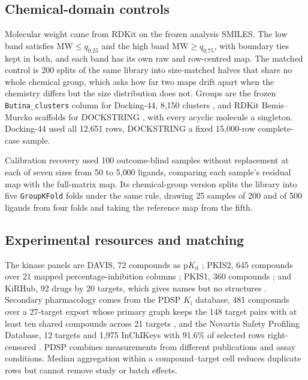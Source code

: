 \subsection{Chemical-domain controls}

Molecular weight came from RDKit on the frozen analysis SMILES. The low band satisfies
$\mathrm{MW}\le q_{0.25}$ and the high band $\mathrm{MW}\ge q_{0.75}$, with boundary ties kept in
both, and each band has its own raw and row-centred map. The matched control is 200 splits of
the same library into size-matched halves that share no whole chemical group, which asks how far
two maps drift apart when the chemistry differs but the size distribution does not. Groups are
the frozen \texttt{Butina\_clusters} column for Docking-44, 8{,}150 clusters \cite{butina1999},
and RDKit Bemis--Murcko scaffolds for DOCKSTRING \cite{murcko1996}, with every acyclic molecule a
singleton. Docking-44 used all 12{,}651 rows, DOCKSTRING a fixed 15{,}000-row complete-case
sample.

Calibration recovery used 100 outcome-blind samples without replacement at each of seven sizes
from 50 to 5{,}000 ligands, comparing each sample's residual map with the full-matrix map. Its
chemical-group version splits the library into five \texttt{GroupKFold} folds under the same
rule, drawing 25 samples of 200 and of 500 ligands from four folds and taking the reference map
from the fifth.

\subsection{Experimental resources and matching}

The kinase panels are DAVIS, 72 compounds as $\mathrm{p}K_\mathrm{d}$
\cite{davis2011,wu2025davis}; PKIS2, 645 compounds over 21 mapped percentage-inhibition columns
\cite{drewry2017}; PKIS1, 360 compounds \cite{elkins2016}; and KiRHub, 92 drugs by 20 targets,
which gives names but no structures \cite{saifudeen2026}. Secondary pharmacology comes from the
PDSP $K_\mathrm{i}$ database, 481 compounds over a 27-target export whose primary graph keeps the
148 target pairs with at least ten shared compounds across 21 targets
\cite{pdspdatabase,pdsp2000,helmuth2000}, and the
Novartis Safety Profiling Database, 12 targets and 1{,}975 InChIKeys with 91.6\% of selected rows
right-censored \cite{sutherland2023}.
PDSP combines measurements from different publications and assay conditions. Median aggregation
within a compound--target cell reduces duplicate rows but cannot remove study or batch effects.

